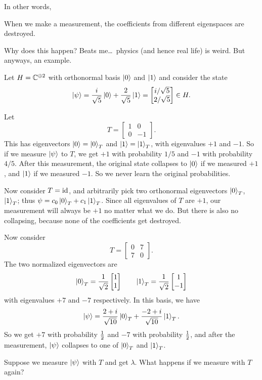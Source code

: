 In other words,
\begin{moral}
	When we make a measurement,
	the coefficients from different eigenspaces are destroyed.
\end{moral}
Why does this happen? Beats me\dots\ physics (and hence real life) is weird.
But anyways, an example.
\begin{example}
	Let $H = \mathbb C^{\oplus 2}$ with orthonormal basis $\ket0$ and $\ket1$
	and consider the state
	\[
		\ket\psi
		= \frac{i}{\sqrt5} \ket 0
		+ \frac{2}{\sqrt5} \ket 1
		= \begin{bmatrix} i/\sqrt5 \\ 2/\sqrt5 \end{bmatrix} \in H.
	\]
	\begin{enumerate}[(a)]
		\ii Let \[ T = \begin{bmatrix} 1 & 0 \\ 0 & -1 \end{bmatrix}. \]
		This has eigenvectors $\ket0 = \ket0_T$ and $\ket1 = \ket1_T$,
		with eigenvalues $+1$ and $-1$.  So if we measure $\ket\psi$ to $T$,
		we get $+1$ with probability $1/5$ and $-1$ with probability $4/5$.
		After this measurement, the original state collapses to
		$\ket0$ if we measured $+1$, and $\ket1$ if we measured $-1$.
		So we never learn the original probabilities.

		\ii Now consider $T = \mathrm{id}$, and arbitrarily
		pick two orthonormal eigenvectors $\ket0_T$, $\ket1_T$;
		thus $\psi = c_0\ket0_T + c_1\ket1_T$.
		Since all eigenvalues of $T$ are $+1$,
		our measurement will always be $+1$ no matter what we do.
		But there is also no collapsing,
		because none of the coefficients get destroyed.

		\ii Now consider
		\[ T = \begin{bmatrix} 0 & 7 \\ 7 & 0 \end{bmatrix}. \]
		The two normalized eigenvectors are
		\[ \ket0_T = \frac{1}{\sqrt2}\begin{bmatrix} 1 \\ 1 \end{bmatrix}
		\qquad \ket1_T = \frac{1}{\sqrt2}\begin{bmatrix} 1 \\ -1 \end{bmatrix} \]
		with eigenvalues $+7$ and $-7$ respectively. In this basis, we have
		\[
			\ket\psi = \frac{2+i}{\sqrt{10}}\ket0_T
			+ \frac{-2+i}{\sqrt{10}}\ket1_T. \]
		So we get $+7$ with probability $\frac{1}{2}$ and $-7$
		with probability $\frac{1}{2}$, and after the measurement,
		$\ket\psi$ collapses to one of $\ket0_T$ and $\ket1_T$.
	\end{enumerate}
\end{example}
\begin{ques}
	Suppose we measure $\ket\psi$ with $T$ and get $\lambda$.
	What happens if we measure with $T$ again?
\end{ques}

